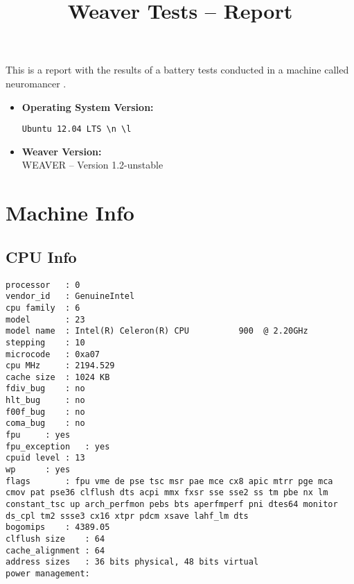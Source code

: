 \documentclass{article}
\title{Weaver Tests -- Report}
\begin{document}
\maketitle
This is a report with the results of a battery
tests conducted in a machine called 
neuromancer
.
\begin{itemize}
\item
\textbf{Operating System Version: }
\begin{verbatim}
Ubuntu 12.04 LTS \n \l

\end{verbatim}
\item
\textbf{Weaver Version: }\\
WEAVER -- Version 1.2-unstable
\end{itemize}
\section{Machine Info}
\subsection{CPU Info}
\begin{verbatim}
processor	: 0
vendor_id	: GenuineIntel
cpu family	: 6
model		: 23
model name	: Intel(R) Celeron(R) CPU          900  @ 2.20GHz
stepping	: 10
microcode	: 0xa07
cpu MHz		: 2194.529
cache size	: 1024 KB
fdiv_bug	: no
hlt_bug		: no
f00f_bug	: no
coma_bug	: no
fpu		: yes
fpu_exception	: yes
cpuid level	: 13
wp		: yes
flags		: fpu vme de pse tsc msr pae mce cx8 apic mtrr pge mca cmov pat pse36 clflush dts acpi mmx fxsr sse sse2 ss tm pbe nx lm constant_tsc up arch_perfmon pebs bts aperfmperf pni dtes64 monitor ds_cpl tm2 ssse3 cx16 xtpr pdcm xsave lahf_lm dts
bogomips	: 4389.05
clflush size	: 64
cache_alignment	: 64
address sizes	: 36 bits physical, 48 bits virtual
power management:

\end{verbatim}
\end{document}
